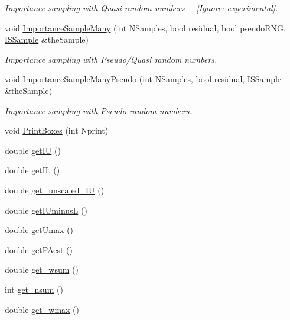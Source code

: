 \begin{DoxyCompactItemize}
\begin{DoxyCompactList}\small\item\em \-Importance sampling with \-Quasi random numbers -\/-\/ \mbox{[}\-Ignore\-: experimental\mbox{]}. \end{DoxyCompactList}\item 
void \hyperlink{classMRSampler_a4fc816422109d41053f1171346463b7d}{\-Importance\-Sample\-Many} (int \-N\-Samples, bool residual, bool pseudo\-R\-N\-G, \hyperlink{classISSample}{\-I\-S\-Sample} \&the\-Sample)
\begin{DoxyCompactList}\small\item\em \-Importance sampling with \-Pseudo/\-Quasi random numbers. \end{DoxyCompactList}\item 
void \hyperlink{classMRSampler_a73999a2d6df8b33ddd459b6bcf9696f9}{\-Importance\-Sample\-Many\-Pseudo} (int \-N\-Samples, bool residual, \hyperlink{classISSample}{\-I\-S\-Sample} \&the\-Sample)
\begin{DoxyCompactList}\small\item\em \-Importance sampling with \-Pseudo random numbers. \end{DoxyCompactList}\item 
void \hyperlink{classMRSampler_a25d99bdee1a715fb2a8e2a8068b890db}{\-Print\-Boxes} (int \-Nprint)
\item 
double \hyperlink{classMRSampler_a92b7d631e838539d7c9dcd047bd2936c}{get\-I\-U} ()
\item 
double \hyperlink{classMRSampler_aaf6497221623367c28cd9054eb52cbba}{get\-I\-L} ()
\item 
double \hyperlink{classMRSampler_a8a056b8e90fb8f72ff3923dca3257384}{get\-\_\-unscaled\-\_\-\-I\-U} ()
\item 
double \hyperlink{classMRSampler_a6d1a6fd3218a62ac5e77abe2a00ac84a}{get\-I\-Uminus\-L} ()
\item 
double \hyperlink{classMRSampler_ab663935171c58ac98f0eeee73c02cbc6}{get\-Umax} ()
\item 
double \hyperlink{classMRSampler_a71c9e4432504b5dcb9591265c4cfba50}{get\-P\-Aest} ()
\item 
double \hyperlink{classMRSampler_a37146ff923183a8563e57191d3e6bfa4}{get\-\_\-wsum} ()
\item 
int \hyperlink{classMRSampler_a281cb5fb693559dcbd4f90e7d5f37d3e}{get\-\_\-nsum} ()
\item 
double \hyperlink{classMRSampler_a85b66f54b156a0a742b48afcf2997379}{get\-\_\-wmax} ()
\item 

\end{DoxyCompactItemize}
